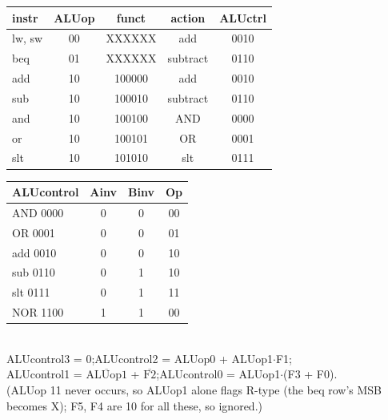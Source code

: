\documentclass[landscape]{article}
\newlength{\fu}\setlength{\fu}{5.4pt}
\begin{document}
\begin{minipage}[t]{0.415\textwidth}
{\begin{tabular}[t]{@{}l c c c c@{}}\toprule
instr & ALUop & funct & action & ALUctrl\\\midrule
lw, sw & 00 & XXXXXX & add & 0010\\
beq & 01 & XXXXXX & subtract & 0110\\
add & 10 & 100000 & add & 0010\\
sub & 10 & 100010 & subtract & 0110\\
and & 10 & 100100 & AND & 0000\\
or & 10 & 100101 & OR & 0001\\
slt & 10 & 101010 & slt & 0111\\\bottomrule
\end{tabular}\hfill
\begin{tabular}[t]{@{}l|c c c@{}}\toprule
ALUcontrol & Ainv & Binv & Op\\\midrule
AND 0000 & 0&0&00\\ OR 0001 &0&0&01\\ add 0010 &0&0&10\\ sub 0110&0&1&10\\ slt 0111&0&1&11\\ NOR 1100&1&1&00\\\bottomrule
\end{tabular}\\[1pt]
ALUcontrol3 = 0;\quad ALUcontrol2 = ALUop0 + ALUop1$\cdot$F1;\\
ALUcontrol1 = $\overline{\text{ALUop1}}$ + $\overline{\text{F2}}$;\quad ALUcontrol0 = ALUop1$\cdot$(F3 + F0).\\
(ALUop 11 never occurs, so ALUop1 alone flags R-type (the beq row's MSB becomes X); F5, F4 are 10 for all these, so ignored.)
}
\end{minipage}
\end{document}
